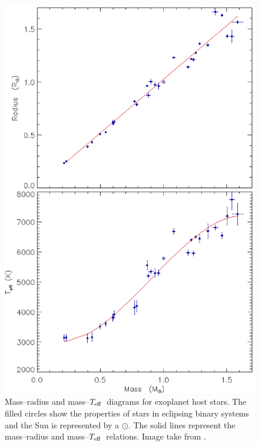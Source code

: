 \begin{figure}
    \centering
    \includegraphics{3-images/final-EB.eps}
    \caption{Mass--radius and mass--$T_{\rm eff}$\ diagrams for exoplanet host stars. The filled circles show the properties of stars in eclipsing binary systems and the Sun is represented by a $\odot$. The solid lines represent the mass--radius and mass--$T_{\rm eff}$\ relations. Image take from \protect\citet{2009MNRAS.394..272S}.}
    \label{introduction:fig:TEPcalibration}
\end{figure}


